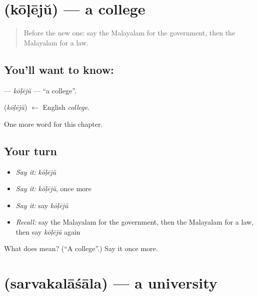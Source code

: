\section[\texorpdfstring{\ml{കോളേജ്} (kōḷējŭ)}{കോളേജ് (kōḷējŭ)}]{ (kōḷējŭ) — a college}

\label{lesson:ML-C299-koleju}



\begin{quote}
Before the new one: say the Malayalam for the government, then the Malayalam for a law.
\end{quote}

\subsection*{You'll want to know: }
\textbf{} — \emph{kōḷējŭ} — \textquotedblleft{}a college\textquotedblright{}.

\begin{cousinweb}
\textbf{} (\emph{kōḷējŭ}) $\leftarrow$ English \emph{college}.
\end{cousinweb}

\begin{grammarlens}[title={What you've built}]
One more word for this chapter.
\end{grammarlens}

\subsection*{Your turn}
\begin{itemize}
\raggedright
  \item \emph{Say it:} \emph{kōḷējŭ}
  \item \emph{Say it:} \emph{kōḷējŭ}, once more
  \item \emph{Say it:} say \emph{kōḷējŭ}
  \item \emph{Recall:} say the Malayalam for the government, then the Malayalam for a law, then say \emph{kōḷējŭ} again
\end{itemize}

\begin{tcolorbox}[breakable,colback=teal!4,colframe=teal!35!black,title={Before you move on}]
What does  mean? (\textquotedblleft{}A college\textquotedblright{}.) Say it once more.
\end{tcolorbox}
\section[\texorpdfstring{\ml{സർവകലാശാല} (sarvakalāśāla)}{സർവകലാശാല (sarvakalāśāla)}]{ (sarvakalāśāla) — a university}

